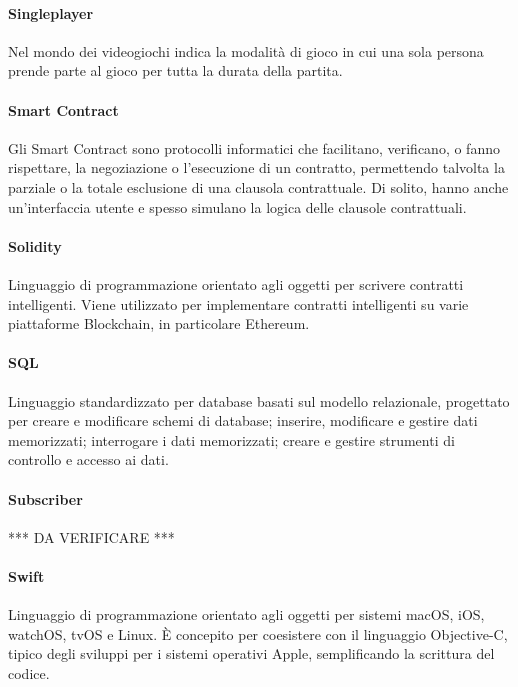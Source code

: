 \documentclass[]{article}
\begin{document}
	\paragraph*{Singleplayer}
	Nel mondo dei videogiochi indica la modalità di gioco in cui una sola persona prende parte al gioco per tutta la durata della partita.
	
	\paragraph*{Smart Contract}
	Gli Smart Contract sono protocolli informatici che facilitano, verificano, o fanno rispettare, la negoziazione o l'esecuzione di un contratto, permettendo talvolta la parziale o la totale esclusione di una clausola contrattuale. Di solito, hanno anche un'interfaccia utente e spesso simulano la logica delle clausole contrattuali.
	
	\paragraph*{Solidity}
	Linguaggio di programmazione orientato agli oggetti per scrivere contratti intelligenti. Viene utilizzato per implementare contratti intelligenti su varie piattaforme Blockchain, in particolare Ethereum.
	
	\paragraph*{SQL}
	Linguaggio standardizzato per database basati sul modello relazionale, progettato per creare e modificare schemi di database; inserire, modificare e gestire dati memorizzati; interrogare i dati memorizzati; creare e gestire strumenti di controllo e accesso ai dati.
	
	\paragraph*{Subscriber}
	*** DA VERIFICARE ***
	
	\paragraph*{Swift}
	Linguaggio di programmazione orientato agli oggetti per sistemi macOS, iOS, watchOS, tvOS e Linux. È concepito per coesistere con il linguaggio Objective-C, tipico degli sviluppi per i sistemi operativi Apple, semplificando la scrittura del codice.
	
	\newpage
	
\end{document}
